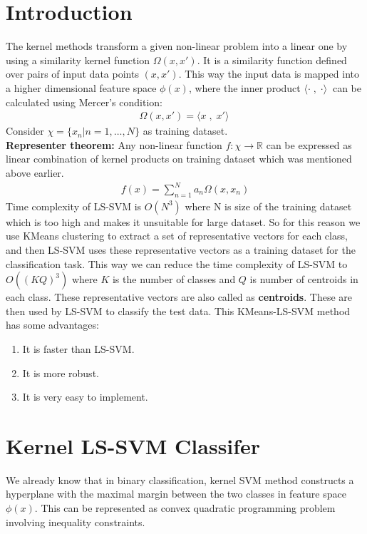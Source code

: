\documentclass[conference]{IEEEtran}
\begin{document}
    \section{Introduction}\label{sec:introduction}
     The kernel methods transform a given non-linear problem into a linear one by using a similarity kernel function $\Omega(x,x\prime)$.
    It is a similarity function defined over pairs of input data points $(x, x\prime)$.
    This way the input data is mapped into a higher dimensional feature space  $\phi(x)$, where the inner product $ \langle\cdot\;,\;\cdot\rangle\ $ can be calculated using Mercer's condition:
    \begin{align}
        \Omega(x,x\prime) = \langle x \;,\; x\prime\rangle\
    \end{align}
    Consider $\chi = \{x_{n} | n=1,\ldots,N\}$ as training dataset. \\
    \textbf{Representer theorem:} Any non-linear function $f : \chi \longrightarrow \mathbb{R}$ can be expressed as linear combination of kernel products on training dataset which was mentioned above earlier.
    \begin{align}
        f(x) = \sum_{n=1}^{N} a_{n}\Omega(x,x_{n})
    \end{align}
    Time complexity of LS-SVM is $O(N^3)$ where N is size of the training dataset which is too high and makes it unsuitable for large dataset.
    So for this reason we use KMeans clustering to extract a set of representative vectors for each class, and then LS-SVM uses these representative vectors as a training dataset for the classification task.
    This way we can reduce the time complexity of LS-SVM to $O((KQ)^3)$ where $K$ is the number of classes and $Q$ is number of centroids in each class.
    These representative vectors are also called as \textbf{centroids}.
    These are then used by LS-SVM to classify the test data.
    This KMeans-LS-SVM method has some advantages:
    \begin{enumerate}
        \item It is faster than LS-SVM.
        \item It is more robust.
        \item It is very easy to implement.
    \end{enumerate}

    \section{Kernel LS-SVM Classifer}\label{sec:kernel-ls-svm-classifer}
    We already know that in binary classification, kernel SVM method constructs a hyperplane with the maximal margin
    between the two classes in feature space $ \phi(x) $.
    This can be represented as convex quadratic programming problem
    involving inequality constraints.
\end{document}
